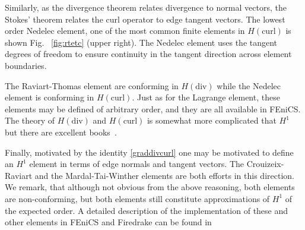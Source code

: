 Similarly, as the divergence theorem relates divergence to normal vectors, the Stokes' theorem relates the curl operator to edge tangent vectors. The lowest order Nedelec element, one of the most common finite elements in  $H(\mbox{curl})$  is shown Fig. ~\ref{fig:rtetc} (upper right). The Nedelec element uses the tangent degrees of freedom to ensure continuity in the tangent direction across element boundaries. 

The Raviart-Thomas element are conforming in $H(\mbox{div})$ while 
the Nedelec element is conforming in $H(\mbox{curl})$. Just as for the Lagrange element, these elements may be defined of arbitrary order, and they are all available in FEniCS. The theory of    $H(\mbox{div})$ and $H(\mbox{curl})$ is somewhat more complicated that $H^1$ but there are excellent books~\cite{arnold2018finite, boffi2013mixed}. 

Finally, motivated by the identity \ref{graddivcurl} one may be motivated to define an $H^1$ element in terms of edge normals and tangent vectors. The Crouizeix-Raviart and the Mardal-Tai-Winther elements are both efforts in this direction. We remark, that although not obvious from the above reasoning, both elements are non-conforming, but both elements still constitute approximations of $H^1$ of the expected order.  
A detailed description of the implementation  of these and other elements 
in FEniCS and Firedrake can be found in \cite{aznaran2022transformations, scroggs2022basix}


